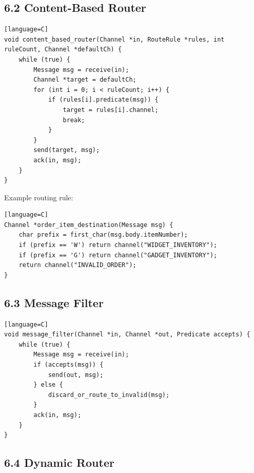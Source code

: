 \documentclass[11pt]{article}
\begin{document}
\subsection{6.2 Content-Based Router}\label{content-based-router}

\begin{verbatim}[language=C]
void content_based_router(Channel *in, RouteRule *rules, int ruleCount, Channel *defaultCh) {
    while (true) {
        Message msg = receive(in);
        Channel *target = defaultCh;
        for (int i = 0; i < ruleCount; i++) {
            if (rules[i].predicate(msg)) {
                target = rules[i].channel;
                break;
            }
        }
        send(target, msg);
        ack(in, msg);
    }
}
\end{verbatim}

Example routing rule:

\begin{verbatim}[language=C]
Channel *order_item_destination(Message msg) {
    char prefix = first_char(msg.body.itemNumber);
    if (prefix == 'W') return channel("WIDGET_INVENTORY");
    if (prefix == 'G') return channel("GADGET_INVENTORY");
    return channel("INVALID_ORDER");
}
\end{verbatim}

\subsection{6.3 Message Filter}\label{message-filter}

\begin{verbatim}[language=C]
void message_filter(Channel *in, Channel *out, Predicate accepts) {
    while (true) {
        Message msg = receive(in);
        if (accepts(msg)) {
            send(out, msg);
        } else {
            discard_or_route_to_invalid(msg);
        }
        ack(in, msg);
    }
}
\end{verbatim}

\subsection{6.4 Dynamic Router}\label{dynamic-router}
\end{document}
